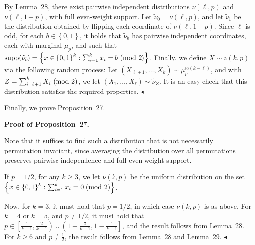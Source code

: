 \documentclass[10pt,a4paper]{article}
\begin{document}
By Lemma 28, there exist pairwise independent distributions $\nu(\ell,p)$ and $\nu(\ell,1-p)$, with full even-weight support.
Let $\tilde{\nu}_{0}=\nu(\ell,p)$, and let $\tilde{\nu}_{1}$ be the distribution obtained by flipping each coordinate of $\nu(\ell,1-p)$.
Since $\ell$ is odd, for each $b\in\left\{0,1\right\}$, it holds that $\tilde{\nu}_{b}$ has pairwise independent coordinates, each with marginal $\mu_{p}$, and such that $\textnormal{supp}(\tilde{\nu}_{b})=\left\{x\in\left\{0,1\right\}^{k}:\sum_{i=1}^{k}x_{i}=b\textnormal{ (mod 2)}\right\}$.
Finally, we define $X\sim\nu(k,p)$ via the following random process: Let $(X_{\ell+1},\dots,X_{k})\sim\mu_{p}^{\otimes\left(k-\ell\right)}$, and with $Z=\sum_{i=\ell+1}^{k}X_{i}\textnormal{ (mod 2)}$, we let $(X_{1},\dots,X_{\ell})\sim\tilde{\nu}_{Z}$.
It is an easy check that this distribution satisfies the required properties.
$\blacktriangleleft$\par




Finally, we prove Proposition 27.\par





\par\medskip\noindent\textbf{Proof of Proposition 27.}\par




Note that it suffices to find such a distribution that is not necessarily permutation invariant, since averaging the distribution over all permutations preserves pairwise independence and full even-weight support.\par




If $p=1/2$, for any $k\geqslant 3$, we let $\nu(k,p)$ be the uniform distribution on the set $\left\{x\in\left\{0,1\right\}^{k}:\sum_{i=1}^{k}x_{i}=0\textnormal{ (mod 2)}\right\}$.\par




Now, for $k=3$, it must hold that $p=1/2$, in which case $\nu(k,p)$ is as above.
For $k=4$ or $k=5$, and $p\not=1/2$, it must hold that $p\in\left[\frac{1}{k-1},\frac{2}{k-1}\right)\cup\left(1-\frac{2}{k-1},1-\frac{1}{k-1}\right]$, and the result follows from Lemma 28.
For $k\geqslant 6$ and $p\not=\frac{1}{2}$, the result follows from Lemma 28 and Lemma 29.
$\blacktriangleleft$\par
\end{document}
